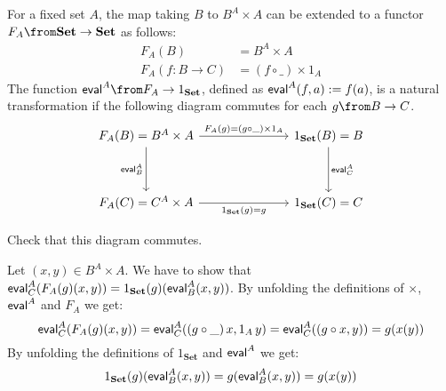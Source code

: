 \begin{exercise}
  For a fixed set $A$, the map taking $B$ to $B^A \times A$ can be extended to
  a functor $F_A\from \mathbf{Set} \to \mathbf{Set}$ as follows:
  \begin{align*}
    F_A(B) & =  B^A \times A\\
    F_A(f: B \to C) & =  (f \circ \_) \times 1_A
  \end{align*}
  The function $\eval{A} \from F_A \to 1_{\mathbf{Set}}$, defined as $\mathsf{eval}^{A}(f,a) := f(a)$, is a natural transformation if the following diagram commutes for each $g \from B \to C$.
\[
  \begin{tikzcd}
    F_A(B) = B^A \times A \arrow{rrr}{F_A(g)=(g\circ \_) \times 1_A} \arrow{dd}[swap]{\eval{A}_B} & & & 1_{\mathbf{Set}}(B) = B \arrow{dd}{\eval{A}_C} \\
                                                                                           & & & \\
    F_A(C) = C^A \times A \arrow{rrr}[swap]{1_{\mathbf{Set}}(g) = g} & & & 1_{\mathbf{Set}}(C) = C
  \end{tikzcd}
\]

Check that this diagram commutes.
\end{exercise}
\begin{answer}
  Let $(x,y) \in B^A \times A$. We have to show that $\mathsf{eval}^{A}_C (F_A(g) (x,y)) = 1_{\mathbf {Set}}(g) (\mathsf{eval}^{A}_B (x, y))$.
  By unfolding the definitions of $\times$, $\mathsf{eval}^{A}$ and $F_A$ we get:
  \[
    \mathsf{eval}^{A}_C (F_A(g) (x,y)) =
    \mathsf{eval}^{A}_C ((g \circ \_)\,x, 1_A\,y) =
    \mathsf{eval}^{A}_C ((g \circ x, y)) =
    g (x (y))
    \]
  By unfolding the definitions of $1_{\mathbf {Set}}$ and $\mathsf{eval}^{A}$ we get:
  \[
    1_{\mathbf {Set}}(g) (\mathsf{eval}^{A}_B (x, y)) =
    g (\mathsf{eval}^{A}_B (x, y)) =
    g (x (y))
    \]
\end{answer}

